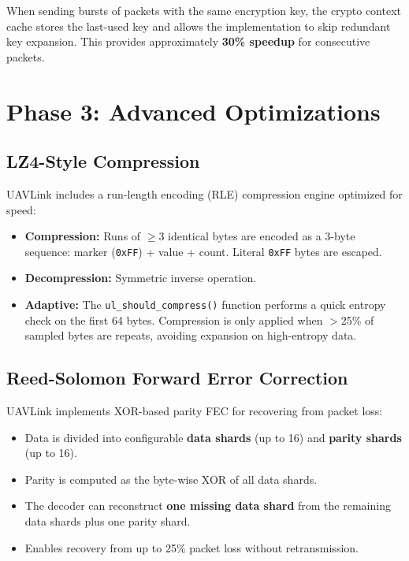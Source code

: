 \documentclass[11pt,a4paper]{article}
\begin{document}
When sending bursts of packets with the same encryption key, the crypto context cache stores the last-used key and allows the implementation to skip redundant key expansion. This provides approximately \textbf{30\% speedup} for consecutive packets.

\section{Phase 3: Advanced Optimizations}

\subsection{LZ4-Style Compression}

UAVLink includes a run-length encoding (RLE) compression engine optimized for speed:

\begin{itemize}[noitemsep]
    \item \textbf{Compression:} Runs of $\geq$3 identical bytes are encoded as a 3-byte sequence: marker (\texttt{0xFF}) + value + count. Literal \texttt{0xFF} bytes are escaped.
    \item \textbf{Decompression:} Symmetric inverse operation.
    \item \textbf{Adaptive:} The \texttt{ul\_should\_compress()} function performs a quick entropy check on the first 64 bytes. Compression is only applied when $>$25\% of sampled bytes are repeats, avoiding expansion on high-entropy data.
\end{itemize}

\subsection{Reed-Solomon Forward Error Correction}

UAVLink implements XOR-based parity FEC for recovering from packet loss:

\begin{itemize}[noitemsep]
    \item Data is divided into configurable \textbf{data shards} (up to 16) and \textbf{parity shards} (up to 16).
    \item Parity is computed as the byte-wise XOR of all data shards.
    \item The decoder can reconstruct \textbf{one missing data shard} from the remaining data shards plus one parity shard.
    \item Enables recovery from up to 25\% packet loss without retransmission.
\end{itemize}
\end{document}
